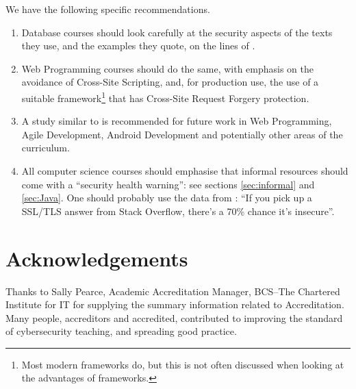 \documentclass[conference]{IEEEtran}
\begin{document}
We have the following specific recommendations.
\begin{enumerate}
\item Database courses should look carefully at the security aspects of the texts they use, and the examples they quote, on the lines of \cite{Drop2019}.
\item Web Programming courses should  do the same, with emphasis on the avoidance of Cross-Site Scripting, and, for production use, the use of a suitable framework\footnote{Most modern frameworks do, but this is not often discussed when looking at the advantages of frameworks.} that has Cross-Site Request Forgery protection. 
\item A study similar to \cite{Drop2019} is recommended for future work in Web Programming, Agile Development, Android Development and potentially other areas of the curriculum.
\item All computer science courses should emphasise that informal resources should come with a ``security health warning'': see sections \ref{sec:informal} and \ref{sec:Java}. One should probably use the data from \cite{Chenetal2019a}: ``If you pick up a SSL/TLS answer from Stack Overflow, there's a 70\% chance it's insecure''.
\end{enumerate}

\section*{Acknowledgements}
Thanks to Sally Pearce, Academic Accreditation Manager, BCS--The
Chartered Institute for IT for supplying the summary information
related to Accreditation. Many people, accreditors and accredited, contributed to  improving the standard of cybersecurity teaching, and spreading good practice.



 
\end{document}

